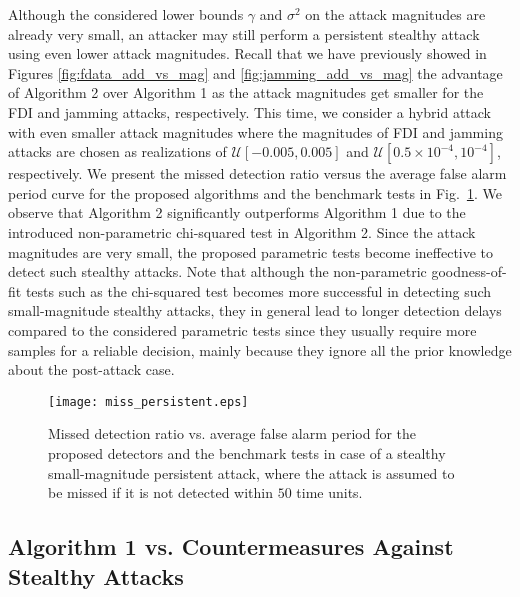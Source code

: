 \documentclass[onecolumn]{IEEEtran}
\begin{document}
Although the considered lower bounds $\gamma$ and $\sigma^2$ on the attack magnitudes are already very small, an attacker may still perform a persistent stealthy attack using even lower attack magnitudes. Recall that we have previously showed in Figures \ref{fig:fdata_add_vs_mag} and \ref{fig:jamming_add_vs_mag} the advantage of Algorithm 2 over Algorithm 1 as the attack magnitudes get smaller for the FDI and jamming attacks, respectively. This time, we consider a hybrid attack with even smaller attack magnitudes where the magnitudes of FDI and jamming attacks are chosen as realizations of $\mathcal{U}[-0.005,0.005]$ and $\mathcal{U}[0.5\times10^{-4},10^{-4}]$, respectively. We present the missed detection ratio versus the average false alarm period curve for the proposed algorithms and the benchmark tests in Fig.~\ref{fig:miss_persistent}. We observe that Algorithm 2 significantly outperforms Algorithm 1 due to the introduced non-parametric chi-squared test in Algorithm 2. Since the attack magnitudes are very small, the proposed parametric tests become ineffective to detect such stealthy attacks. Note that although the non-parametric goodness-of-fit tests such as the chi-squared test becomes more successful in detecting such small-magnitude stealthy attacks, they in general lead to longer detection delays compared to the considered parametric tests since they usually require more samples for a reliable decision, mainly because they ignore all the prior knowledge about the post-attack case.

\begin{figure}
\center
  \texttt{[image: miss\_persistent.eps]}
\caption{Missed detection ratio vs. average false alarm period for the proposed detectors and the benchmark tests in case of a stealthy small-magnitude persistent attack, where the attack is assumed to be missed if it is not detected within $50$ time units.}
 \label{fig:miss_persistent}
\end{figure}

\subsection{Algorithm 1 vs. Countermeasures Against Stealthy Attacks}
\end{document}
